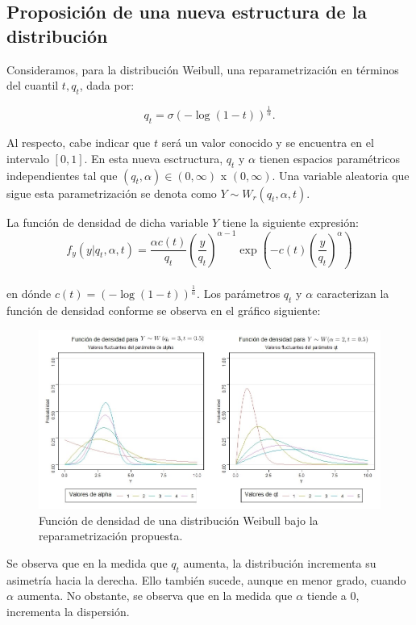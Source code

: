 \documentclass{report}
\begin{document}
\subsection{Proposición de una nueva estructura de la distribución}

Consideramos, para la distribución Weibull, una reparametrización en términos del cuantil $t, q_{t}$, dada por:

\[q_{t}=\sigma\left( -\log\left( 1-t \right) \right)^{\frac{1}{\alpha}}.\]

Al respecto, cabe indicar que $t$ será un valor conocido y se encuentra en el intervalo $[0,1]$. En esta nueva esctructura, $q_{t}$ y $\alpha$ tienen espacios paramétricos independientes tal que $(q_{t},\alpha) \in (0,\infty)$ x $(0,\infty)$. Una variable aleatoria que sigue esta parametrización se denota como $Y \sim W_{r}(q_{t},\alpha,t)$.

La función de densidad de dicha variable $Y$ tiene la siguiente expresión:
\begin{equation}
f_{y}(y| q_{t},\alpha,t)=\frac{\alpha c(t)}{q_{t}}\left( \frac{y}{q_{t}} \right)^{\alpha-1}\exp\left( -c(t)\left( \frac{y}{q_{t}} \right)^{\alpha} \right)
\end{equation}
\\
\noindent en dónde $c(t)= \left( -\log(1-t) \right)^{\frac{1}{\alpha}}$. Los parámetros $q_{t}$ y $\alpha$ caracterizan la función de densidad conforme se observa en el gráfico siguiente:

\begin{figure}[H]
\includegraphics[width=\textwidth]{densidad1}
\caption{Función de densidad de una distribución Weibull bajo la reparametrización propuesta.}
\end{figure}

\noindent Se observa que en la medida que $q_{t}$ aumenta, la distribución incrementa su asimetría hacia la derecha. Ello también sucede, aunque en menor grado, cuando $\alpha$ aumenta. No obstante, se observa que en la medida que $\alpha$ tiende a 0, incrementa la dispersión.
\end{document}
